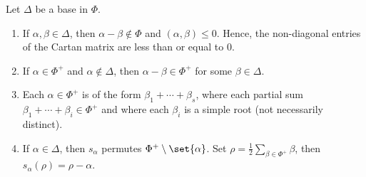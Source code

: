 Let $\Delta$ be a base in $\Phi$.

\begin{enumerate}[label=(\alph*)]
	\item If $\alpha, \beta \in \Delta$, then $\alpha - \beta \notin \Phi$ and
		$(\alpha, \beta) \leq 0$. Hence, the non-diagonal entries of
		the Cartan matrix are less than or equal to $0$.
	\item If $\alpha \in \Phi^+$ and $\alpha \notin\Delta$, then
		$\alpha - \beta \in \Phi^+$ for some $\beta \in \Delta$.
	\item Each $\alpha \in \Phi^+$ is of the form $\beta_1+\cdots+\beta_s$, where
		each partial sum $\beta_1+\cdots+\beta_i \in \Phi^+$ and where
		each $\beta_i$ is a simple root (not necessarily distinct).
	\item If $\alpha \in \Delta$, then $s_\alpha$ permutes $\Phi^+\setminus\set{\alpha}$.
		Set $\rho = \frac{1}{2}\sum_{\beta \in \Phi^+}\beta$, then $s_\alpha(\rho) = \rho-\alpha$.
\end{enumerate}
